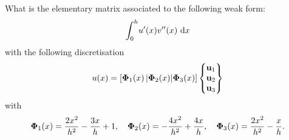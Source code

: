 \bexo

What is the elementary matrix associated to the following weak form:
\begin{equation}
	\displaystyle{\int_{0}^h} u'(x)v''(x)\,\,\textrm{d} x 
\end{equation}
with the following discretisation
\begin{equation}
	u(x)=[\boldsymbol{\Phi}_1(x)\, | \boldsymbol{\Phi}_2(x)| \boldsymbol{\Phi}_3(x)]
	\begin{Bmatrix}
		\textbf{u}_1\\
		\textbf{u}_2\\
		\textbf{u}_3
	\end{Bmatrix}
\end{equation}
with 
\begin{equation}
	\boldsymbol{\Phi}_1(x)=\dfrac{2x^2}{h^2}-\dfrac{3x}{h}+1 , \quad \boldsymbol{\Phi}_2(x)=-\dfrac{4x^2}{h^2}+\dfrac{4x}{h}
	, \quad \boldsymbol{\Phi}_3(x)= \dfrac{2x^2}{h^2}-\dfrac{x}{h}.
\end{equation}

\eexo

\solution{

}